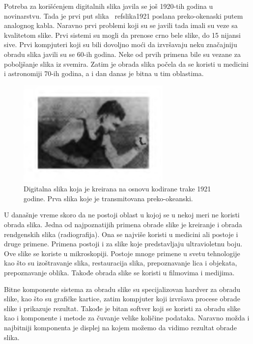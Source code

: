 \documentclass[a4paper,12pt,titlepage]{article}
\begin{document}
Potreba za korišćenjem digitalnih slika javila se još 1920-tih godina u novinarstvu. Tada je prvi put slika ~ref{slika1921} poslana preko-okenaski putem analognog kabla. Naravno prvi problemi koji su se javili tada imali su veze sa kvalitetom slike. Prvi sistemi su mogli da prenose crno bele slike, do 15 nijansi sive. Prvi kompjuteri koji su bili dovoljno moći da izvršavaju neku značajniju obradu slika javili su se 60-ih godina. Neke od prvih primena bile su vezane za poboljšanje slika iz svemira. Zatim je obrada slika počela da se koristi u medicini i astronomiji 70-ih godina, a i dan danas je bitna u tim oblastima.

\begin{figure}[ht!]
\centering
\includegraphics[width=75mm]{img/prvaPrenesenaSlika.png}
\caption{Digitalna slika koja je kreirana na osnovu kodirane trake 1921 godine. Prva slika koje je transmitovana preko-okeanski.}
\label{slika1921}
\end{figure} 

U današnje vreme skoro da ne postoji oblast u kojoj se u nekoj meri ne koristi obrada slika. Jedna od najpoznatijih primena obrade slike je kreiranje i obrada rendgenskih slika (radiografija). Ona se najviše koristi u medicini ali postoje i druge primene. Primena postoji i za slike koje predstavljaju ultravioletnu boju. Ove slike se koriste u mikroskopiji. Postoje mnoge primene u svetu tehnologije kao što su izoštravanje slika, restauracija slika, prepoznavanje lica i objekata, prepoznavanje oblika. Takođe obrada slike se koristi u filmovima i medijima.  

Bitne komponente sistema za obradu slike su specijalizovan hardver za obradu slike, kao što su grafičke kartice, zatim kompjuter koji izvršava procese obrade slike i prikazuje rezultat. Takođe je bitan softver koji se koristi za obradu slike kao i komponente i metode za čuvanje velike količine podataka. Naravno možda i najbitniji komponenta je displej na kojem možemo da vidimo rezultat obrade slika.            
\end{document}
